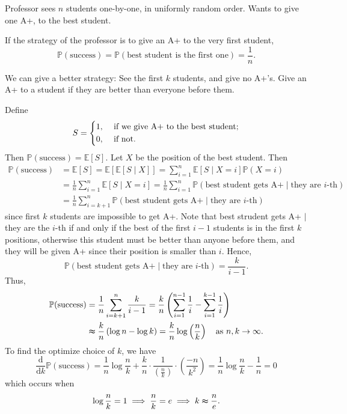 \begin{eg}
    Professor sees \(n\) students one-by-one, in uniformly random order. Wants to give one A+, to the best student.

    If the strategy of the professor is to give an A+ to the very first student,
    \[
        \mathbb{P} (\text{success} ) = \mathbb{P} \left( \text{best student is the first one}  \right) = \frac{1}{n}. 
    \]

    We can give a better strategy: See the first \(k\) students, and give no A+'s. Give an A+ to a student if they are better than everyone before them. 

    Define 
    \[
        S = \begin{dcases}
            1, &\text{ if we give A+ to the best student}  ;\\
            0, &\text{ if not}  .
        \end{dcases}
    \]  
    Then \(\mathbb{P} (\text{success} ) = \mathbb{E} [S]\). Let \(X\) be the position of the best student. Then 
    \begin{align*}
        \mathbb{P} (\text{success} ) &= \mathbb{E} [S] = \mathbb{E} [\mathbb{E} [S \mid X]] = \sum_{i=1}^n \mathbb{E} [S \mid X = i] \mathbb{P} (X = i) \\
        &= \frac{1}{n} \sum_{i=1}^n \mathbb{E} [S \mid X = i] = \frac{1}{n} \sum_{i=1}^n \mathbb{P} (\text{best student gets A+} \mid \text{they are } i \text{-th}   ) \\
        &= \frac{1}{n} \sum_{i=k+1}^n \mathbb{P} (\text{best student gets A+} \mid \text{they are } i \text{-th})  
    \end{align*}  
    since first \(k\) students are impossible to get A+.  Note that best strudent gets A+ \(\mid\) they are the \(i\)-th if and only if the best of the first \(i - 1\) students is in the first \(k\) positions, otherwise this student must be better than anyone before them, and they will be given A+ since their position is smaller than \(i\). Hence,
    \[
        \mathbb{P} (\text{best student gets A+} \mid \text{they are } i \text{-th}   ) = \frac{k}{i - 1}.
    \]     
    Thus,
    \begin{align*}
        \mathbb{P} (\text{success} ) &= \frac{1}{n} \sum_{i=k+1}^n \frac{k}{i - 1} = \frac{k}{n} \left( \sum_{i=1}^{n - 1} \frac{1}{i} - \sum_{i=1}^{k - 1} \frac{1}{i}   \right) \\
        &\thickapprox \frac{k}{n} \left( \log n - \log k \right) = \frac{k}{n} \log \left( \frac{n}{k} \right) \quad \text{as } n, k \to \infty .   
    \end{align*}
    To find the optimize choice of \(k\), we have 
    \[
        \frac{\mathrm{d}}{\mathrm{d}k} \mathbb{P} (\text{success} ) = \frac{1}{n} \log \frac{n}{k} + \frac{k}{n} \cdot \frac{1}{\left( \frac{n}{k} \right) } \cdot \left( \frac{-n}{k^2} \right) = \frac{1}{n} \log \frac{n}{k} - \frac{1}{n} = 0  
    \] 
    which occurs when 
    \[
        \log \frac{n}{k} = 1 \implies \frac{n}{k} = e \implies k \thickapprox \frac{n}{e}.
    \]
\end{eg}

